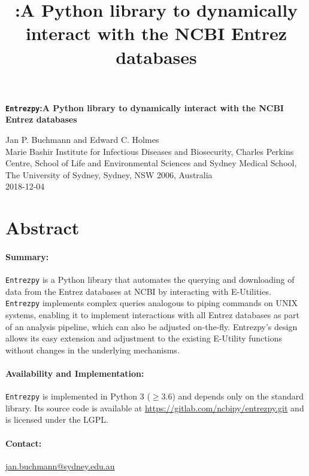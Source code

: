\documentclass[a4paper]{article}
\title{\entrezpy:A Python library to dynamically interact with the
       NCBI Entrez databases}
\newcommand{\entrezpy}{\texttt{Entrezpy}\xspace}
\begin{document}
  \begin{minipage}{.75\textwidth}
      \textbf{\large{\entrezpy:A Python library to dynamically interact with the
             NCBI Entrez databases}}
    \vspace{\baselineskip}
    \setlength{\parskip}{\smallskipamount}
    \begin{center}
    Jan P. Buchmann and Edward C. Holmes
    \vspace{\baselineskip}
    \setlength{\parskip}{\smallskipamount}\\
    \small{Marie Bashir Institute for Infectious Diseases and Biosecurity, Charles Perkins Centre, School of
    Life and Environmental Sciences and Sydney Medical School, The University of Sydney,
    Sydney, NSW 2006, Australia}\\[2em]
    \small{2018-12-04}
    \end{center}

  \end{minipage}
\vspace{2\baselineskip}

\section{Abstract}
  \paragraph{Summary:} \entrezpy is a Python library that automates the querying
  and downloading of data from the Entrez databases at NCBI by interacting with
  E-Utilities. \entrezpy implements complex queries analogous to piping commands
  on UNIX systems, enabling it to implement interactions with all Entrez
  databases as part of an analysis pipeline, which can also be adjusted
  on-the-fly. Entrezpy’s design allows its easy extension and adjustment to the
  existing E-Utility functions without changes in the underlying mechanisms.

  \paragraph{Availability and Implementation:} \entrezpy is implemented in
  Python 3 ($\geq$3.6) and depends only on the standard library. Its source code
  is available at \url{https://gitlab.com/ncbipy/entrezpy.git} and is licensed
  under the LGPL.

  \paragraph{Contact:} \href{jan.buchmann@sydney.edu.au}{jan.buchmann@sydney.edu.au}
\end{document}
